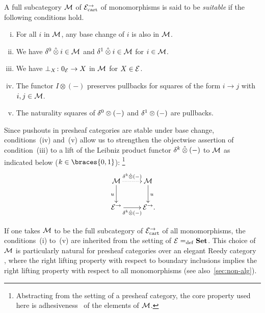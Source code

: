 \documentclass[reqno,10pt,a4paper,oneside,draft]{amsart}
\begin{document}
\begin{definition} \label{uniform-fib-presheaf-cat}
A full subcategory $\cal{M}$ of $\catE_\cart^\to$ of monomorphisms is said to be \emph{suitable} if the following conditions hold.
\begin{enumerate}[(i)]
\item For all $i$ in $\cal{M}$, any base change of $i$ is also in $\cal{M}$.
\item We have $\lcyl \hatotimes i \in \cal{M}$ and $\rcyl \hatotimes i \in \cal{M}$ for $i \in \cal{M}$.
\item We have $\bot_X \co 0_{\cal{E}} \to X$ in $\cal{M}$ for $X \in \cal{E}$.
\item The functor $I \otimes (-)$ preserves pullbacks for squares of the form $i \to j$ with $i, j \in \cal{M}$.
\item The naturality squares of $\lcyl \otimes (-)$ and $\rcyl \otimes (-)$ are pullbacks.
\end{enumerate}
\end{definition}

\begin{remark} \label{rem-lift-suitable}
Since pushouts in presheaf categories are stable under base change, conditions~(iv) and~(v) allow us to strengthen the objectwise assertion of condition~(iii) to a lift of the Leibniz product functor $\kcyl \hatotimes (-)$ to $\cal{M}$ as indicated below ($k \in \braces{0, 1}$):%
\footnote{Abstracting from the setting of a presheaf category, the core property used here is adhesiveness~\cite{garner-lack:adhesive} of the elements of $\cal{M}$.}
\[
\xymatrix{
  \cal{M}
  \ar@{.>}[r]^{\kcyl \hatotimes (-)}
  \ar[d]_{u}
&
  \cal{M}
  \ar[d]^{u}
\\
  \catE^\to
  \ar[r]_{\kcyl \hatotimes (-)}
&
  \catE^\to
\rlap{.}}
\]
\end{remark}

If one takes $\cal{M}$ to be the full subcategory of $\catE_\cart^\to$ of all monomorphisms, the conditions~(i) to~(v) are inherited from the setting of $\calE \defeq \Set$.
This choice of $\cal{M}$ is particularly natural for presheaf categories over an elegant Reedy category~\cite{bergner-rezk-elegant} , where the right lifting property with respect to boundary inclusions implies the right lifting property with respect to all monomorphisms (see also~\cref{sec:non-alg}).
\end{document}
